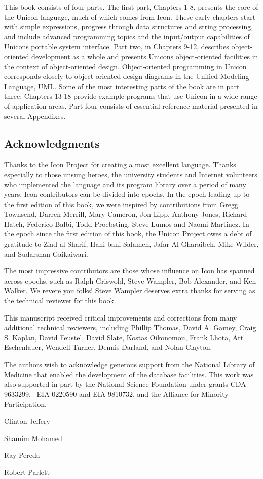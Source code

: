 This book consists of four parts. The first part, Chapters 1-8, presents
the core of the Unicon language, much of which comes from Icon. These
early chapters start with simple expressions, progress through data
structures and string processing, and include advanced programming
topics and the input/output capabilities of Unicon{\textquotesingle}s
portable system interface. Part two, in Chapters 9-12, describes
object-oriented development as a whole and presents
Unicon{\textquotesingle}s object-oriented facilities in the context of
object-oriented design. Object-oriented programming in Unicon
corresponds closely to object-oriented design diagrams in the Unified
Modeling Language, UML. Some of the most interesting parts of the book
are in part three; Chapters 13-18 provide example programs that use
Unicon in a wide range of application areas. Part four consists of
essential reference material presented in several Appendixes.

\subsection{Acknowledgments}

Thanks to the Icon Project for creating a most excellent language.
Thanks especially to those unsung heroes, the university students and
Internet volunteers who implemented the language and its
program library over a period of many years. Icon contributors can be
divided into epochs. In the epoch leading up to the first edition of
this book, we were inspired by
contributions from Gregg Townsend, Darren Merrill, Mary Cameron, Jon
Lipp, Anthony Jones, Richard Hatch, Federico Balbi, Todd Proebsting,
Steve Lumos and Naomi Martinez.  In the epoch since the first edition
of this book, the Unicon Project owes a debt of gratitude to Ziad al
Sharif, Hani bani Salameh, Jafar Al Gharaibeh, Mike Wilder, and Sudarshan
Gaikaiwari.

The most impressive contributors are those whose influence on Icon has
spanned across epochs, such as Ralph Griswold, Steve Wampler, Bob
Alexander, and Ken Walker. We revere you folks! Steve Wampler deserves
extra thanks for serving as the technical reviewer for this book.

This manuscript received critical improvements and corrections from many
additional technical reviewers, including Phillip Thomas, David A.
Gamey, Craig S. Kaplan, David Feustel, David Slate, Kostas Oikonomou,
Frank Lhota, Art Eschenlauer, Wendell Turner, Dennis Darland, and Nolan
Clayton.

The authors wish to acknowledge generous support from the National
Library of Medicine that enabled the development of the database
facilities. This work was also supported in part by the National
Science Foundation under grants CDA-9633299, \ EIA-0220590 and
EIA-9810732, and the Alliance for Minority Participation.

Clinton Jeffery

Shamim Mohamed

Ray Pereda

Robert Parlett
